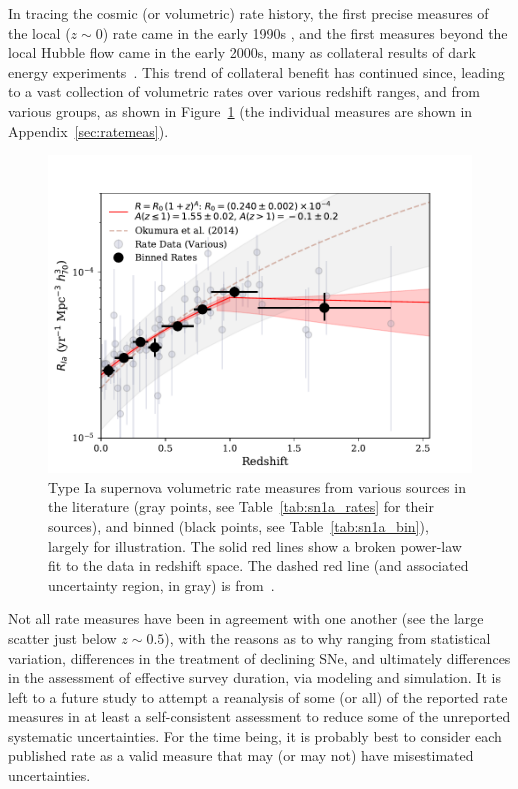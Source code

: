\documentclass[apj, linenumbers]{aastex62}
\begin{document}
In tracing the cosmic (or volumetric) rate history, the first precise measures of the local ($z\sim0$) rate came in the early 1990s \cite[cf.][]{Cappellaro:1993qm,Cappellaro:1999}, and the first measures beyond the local Hubble flow came in the early 2000s, many as collateral results of dark energy experiments~\citep{Riess:1998,Perlmutter:1999}. This trend of collateral benefit has continued since, leading to a vast collection of volumetric rates over various redshift ranges, and from various groups, as shown in Figure~\ref{fig:sn1a_rates} (the individual measures are shown in Appendix~\ref{sec:ratemeas}). 

\begin{figure}[t]
   \centering
   \includegraphics[width=6.1in]{figure_SNIa_rate_z_pwr_fit.pdf}
   \caption{\footnotesize Type Ia supernova volumetric rate measures from various sources in the literature (gray points, see Table~\ref{tab:sn1a_rates} for their sources), and binned (black points, see Table~\ref{tab:sn1a_bin}), largely for illustration. The solid red lines show a broken power-law fit to the data in redshift space. The dashed red line (and associated uncertainty region, in gray) is from~\cite{Okumura:2014}.}
   \label{fig:sn1a_rates}
\end{figure}

Not all rate measures have been in agreement with one another (see the large scatter just below $z\sim0.5$), with the reasons as to why ranging from statistical variation, differences in the treatment of declining SNe, and ultimately differences in the assessment of effective survey duration, via modeling and simulation. It is left to a future study to attempt a reanalysis of some (or all) of the reported rate measures in at least a self-consistent assessment to reduce some of the unreported systematic uncertainties. For the time being, it is probably best to consider each published rate as a valid measure that may (or may not) have misestimated uncertainties. 
\end{document}

